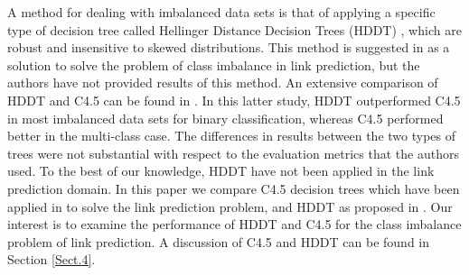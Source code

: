 \documentclass{acm_proc_article-sp}
\begin{document}
A method for dealing with imbalanced data sets is that of applying a specific type of decision tree called Hellinger Distance Decision Trees (HDDT) \cite{Cieslak2008, Cieslak2012}, which are robust and insensitive to skewed distributions. This method is suggested in \cite{Lichtenwalter:2010:NPM:1835804.1835837} as a solution to solve the problem of class imbalance in link prediction, but the authors have not provided results of this method. An extensive comparison of HDDT and C4.5 can be found in \cite{Cieslak2012}. In this latter study, HDDT outperformed C4.5 in most imbalanced data sets for binary classification, whereas C4.5 performed better in the multi-class case. The differences in results between the two types of trees were not substantial with respect to the evaluation metrics that the authors used. To the best of our knowledge, HDDT have not been applied in the link prediction domain. In this paper we compare C4.5 decision trees \cite{quinlan2014c4} which have been applied in \cite{Hasan06linkprediction} to solve the link prediction problem, and HDDT as proposed in \cite{Lichtenwalter:2010:NPM:1835804.1835837}. Our interest is to examine the performance of HDDT and C4.5 for the class imbalance problem of link prediction. A discussion of C4.5 and HDDT can be found in Section \ref{Sect.4}. 

\end{document}
